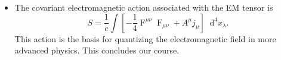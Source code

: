 \documentclass[11pt, a4paper]{article}
\newcommand{\diff}{\mathop{}\!\mathrm{d}} %
\begin{document}
\begin{itemize}
	\item The covariant electromagnetic action associated with the EM tensor is
	\begin{equation*}
		S = \frac{1}{c}\int \left[- \frac{1}{4}\operatorname{F}^{\mu\nu}\operatorname{F}_{\mu\nu} + A^{\mu}j_{\mu}\right]\diff^{4}x_{\lambda}.
	\end{equation*}
	This action is the basis for quantizing the electromagnetic field in more advanced physics. This concludes our course.
	
\end{itemize}
\end{document}

